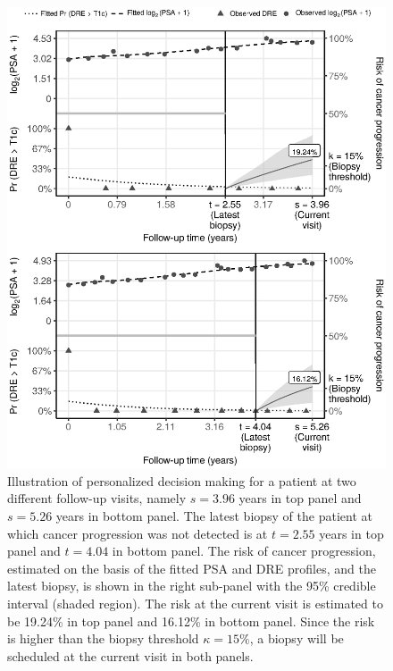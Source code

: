 \begin{figure}[!htb]
\captionsetup{justification=justified}
\centerline{\includegraphics[width=\columnwidth]{images/dynRiskPlot_2340.eps}}
\caption{Illustration of personalized decision making for a patient at two different follow-up visits, namely $s=3.96$ years in top panel and $s=5.26$ years in bottom panel. The latest biopsy of the patient at which cancer progression was not detected is at $t=2.55$ years in top panel and $t=4.04$ in bottom panel. The risk of cancer progression, estimated on the basis of the fitted PSA and DRE profiles, and the latest biopsy,  is shown in the right sub-panel with the 95\% credible interval (shaded region). The risk at the current visit is estimated to be 19.24\% in top panel and 16.12\% in bottom panel. Since the risk is higher than the biopsy threshold $\kappa=15\%$, a biopsy will be scheduled at the current visit in both panels.}
\label{fig:dynRiskPlot_2340}
\end{figure}

